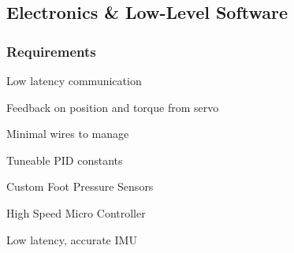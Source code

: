     
        



    \subsection{Electronics \& Low-Level Software}
        \subsubsection{Requirements}
            \begin{Deliverables} %
                \item Low latency communication
                \item Feedback on position and torque from servo
                \item Minimal wires to manage
                \item Tuneable PID constants
                \item Custom Foot Pressure Sensors
                \item High Speed Micro Controller
                \item Low latency, accurate IMU
            \end{Deliverables}

